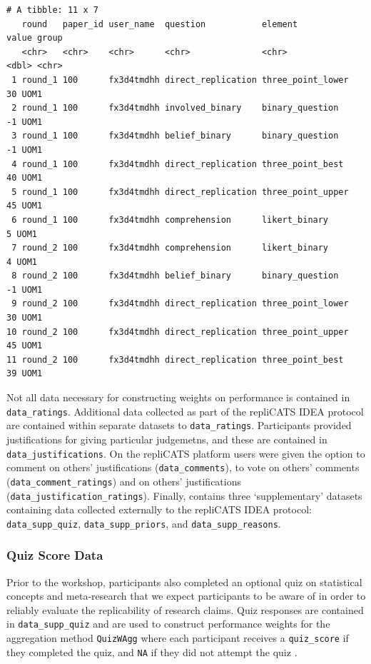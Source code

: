 \documentclass[article]{jss}
\begin{document}
\begin{verbatim}
# A tibble: 11 x 7
   round   paper_id user_name  question           element           value group
   <chr>   <chr>    <chr>      <chr>              <chr>             <dbl> <chr>
 1 round_1 100      fx3d4tmdhh direct_replication three_point_lower    30 UOM1 
 2 round_1 100      fx3d4tmdhh involved_binary    binary_question      -1 UOM1 
 3 round_1 100      fx3d4tmdhh belief_binary      binary_question      -1 UOM1 
 4 round_1 100      fx3d4tmdhh direct_replication three_point_best     40 UOM1 
 5 round_1 100      fx3d4tmdhh direct_replication three_point_upper    45 UOM1 
 6 round_1 100      fx3d4tmdhh comprehension      likert_binary         5 UOM1 
 7 round_2 100      fx3d4tmdhh comprehension      likert_binary         4 UOM1 
 8 round_2 100      fx3d4tmdhh belief_binary      binary_question      -1 UOM1 
 9 round_2 100      fx3d4tmdhh direct_replication three_point_lower    30 UOM1 
10 round_2 100      fx3d4tmdhh direct_replication three_point_upper    45 UOM1 
11 round_2 100      fx3d4tmdhh direct_replication three_point_best     39 UOM1 
\end{verbatim}

Not all data necessary for constructing weights on performance is
contained in \texttt{data\_ratings}. Additional data collected as part
of the repliCATS IDEA protocol are contained within separate datasets to
\texttt{data\_ratings}. Participants provided justifications for giving
particular judgemetns, and these are contained in
\texttt{data\_justifications}. On the repliCATS platform users were
given the option to comment on others' justifications
(\texttt{data\_comments}), to vote on others' comments
(\texttt{data\_comment\_ratings}) and on others' justifications
(\texttt{data\_justification\_ratings}). Finally, 
contains three `supplementary' datasets containing data collected
externally to the repliCATS IDEA protocol: \texttt{data\_supp\_quiz},
\texttt{data\_supp\_priors}, and \texttt{data\_supp\_reasons}.

\hypertarget{sec-quiz-supplementary-data}{%
\subsubsection{Quiz Score Data}\label{sec-quiz-supplementary-data}}

Prior to the workshop, participants also completed an optional quiz on
statistical concepts and meta-research that we expect participants to be
aware of in order to reliably evaluate the replicability of research
claims. Quiz responses are contained in \texttt{data\_supp\_quiz} and
are used to construct performance weights for the aggregation method
\texttt{QuizWAgg} where each participant receives a \texttt{quiz\_score}
if they completed the quiz, and \texttt{NA} if they did not attempt the
quiz \citep[see][ for further details]{Hanea2021}.
\end{document}
